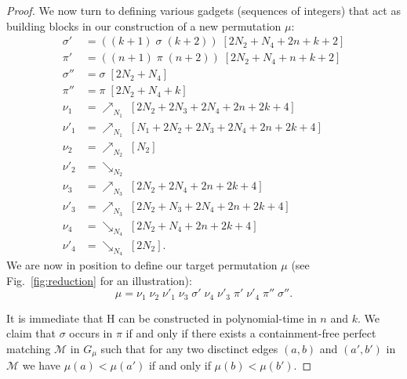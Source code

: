 \documentclass[a4paper]{llncs}
\begin{document}
\begin{proof}
  We now turn to defining various gadgets (sequences of integers)
  that act as building blocks in our construction of a new permutation $\mu$:
  \begin{align*}
  \sigma'  &= ((k+1) \; \sigma \; (k+2)) \; [2N_2 + N_4 + 2n + k + 2] \\
  \pi'     &= ((n+1) \; \pi \; (n+2)) \; [2N_2 + N_4 + n + k + 2] \\
  \sigma'' &= \sigma \; [2N_2 + N_4] \\
  \pi''    &= \pi \; [2N_2 + N_4 + k] \\
  \nu_1    &= \nearrow_{N_1} \; [2N_2 + 2N_3 + 2N_4 + 2n + 2k + 4] \\
  \nu'_1   &= \nearrow_{N_1} \; [N_1 + 2N_2 + 2N_3 + 2N_4 + 2n + 2k + 4] \\
  \nu_2    &= \nearrow_{N_2} \; [N_2] \\
  \nu'_2   &= \searrow_{N_2} \\
  \nu_3    &= \nearrow_{N_3} \; [2N_2 + 2N_4 + 2n + 2k + 4] \\
  \nu'_3   &= \nearrow_{N_3} \; [2N_2 + N_3 + 2N_4 + 2n + 2k + 4] \\
  \nu_4    &= \searrow_{N_4} \; [2N_2 + N_4 + 2n + 2k + 4] \\
  \nu'_4   &= \searrow_{N_4} \; [2N_2]\text{.}
  \end{align*}
  We are now in position to define our target permutation $\mu$
  (see Fig.~\ref{fig:reduction} for an illustration):
  $$
  \mu
  =
  \nu_1 \; \nu_2 \; \nu'_1 \; \nu_3 \; \sigma' \; \nu_4 \; \nu'_3 \; \pi' \; \nu'_4 \; \pi'' \; \sigma''
  \text{.}
  $$

  It is immediate that H can be constructed in polynomial-time in $n$ and $k$.
  We claim that $\sigma$ occurs in $\pi$ if and only if
  there exists a containment-free perfect matching
  $\mathcal{M}$ in $G_\mu$ such that
  for any two disctinct edges
  $(a, b)$ and $(a', b')$ in $\mathcal{M}$
  we have $\mu(a) < \mu(a')$ if and only if $\mu(b) < \mu(b')$.


\end{proof}
\end{document}
